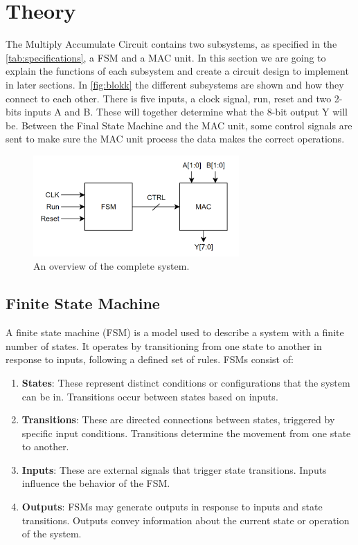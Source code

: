 \newpage
\section{Theory}
\label{sec:theory}

The Multiply Accumulate Circuit contains two subsystems, as specified in the \autoref{tab:specifications}, a FSM and a MAC unit. In this section we are going to explain the functions of each subsystem and create a circuit design to implement in later sections. In \autoref{fig:blokk} the different subsystems are shown and how they connect to each other. There is five inputs, a clock signal, run, reset and two 2-bits inputs A and B. These will together determine what the 8-bit output Y will be. Between the Final State Machine and the MAC unit, some control signals are sent to make sure the MAC unit process the data makes the correct operations. 

\begin{figure}[H]
    \centering
    \includegraphics[width=0.7\textwidth]{Figures/Blokk.png}
    \caption{An overview of the complete system.}
    \label{fig:blokk}
\end{figure}

\subsection{Finite State Machine}
\label{subsec:fsm_theory}

A finite state machine (FSM) is a model used to describe a system with a finite number of states. It operates by transitioning from one state to another in response to inputs, following a defined set of rules. FSMs consist of:

\begin{enumerate}
    \item \textbf{States}: These represent distinct conditions or configurations that the system can be in. Transitions occur between states based on inputs.
    
    \item \textbf{Transitions}: These are directed connections between states, triggered by specific input conditions. Transitions determine the movement from one state to another.
    
    \item \textbf{Inputs}: These are external signals that trigger state transitions. Inputs influence the behavior of the FSM.
    
    \item \textbf{Outputs}: FSMs may generate outputs in response to inputs and state transitions. Outputs convey information about the current state or operation of the system.
\end{enumerate}

